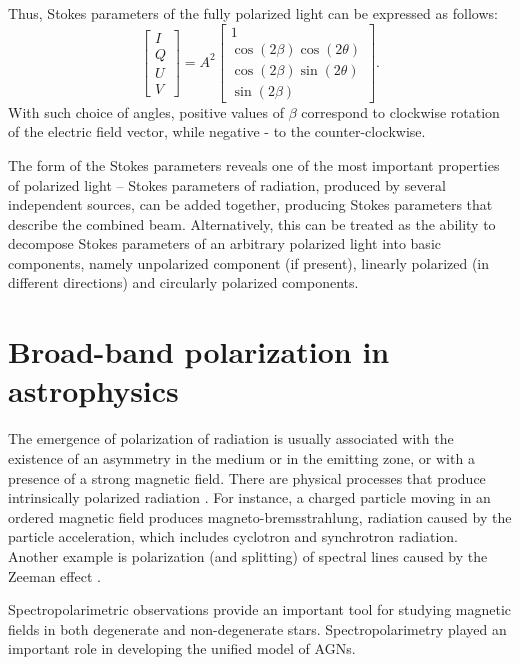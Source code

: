 Thus, Stokes parameters of the fully polarized light can be expressed as follows: 
\begin{equation}
    \begin{bmatrix}
        I\\Q\\U\\V
    \end{bmatrix} = A^2
    \begin{bmatrix}
        1 \\
        \cos(2\beta)\cos(2\theta) \\
        \cos(2\beta)\sin(2\theta) \\
        \sin(2\beta)
    \end{bmatrix}.
\end{equation}
With such choice of angles, positive values of $\beta$ correspond to clockwise rotation of the electric field vector, while negative - to the counter-clockwise.

The form of the Stokes parameters reveals one of the most important properties of polarized light -- Stokes parameters of radiation, produced by several independent sources, can be added together, producing Stokes parameters that describe the combined beam.
Alternatively, this can be treated as the ability to decompose Stokes parameters of an arbitrary polarized light into basic components, namely unpolarized component (if present), linearly polarized (in different directions) and circularly polarized components.

\section{Broad-band polarization in astrophysics}
The emergence of polarization of radiation is usually associated with the existence of an asymmetry in the medium or in the emitting zone, or with a presence of a strong magnetic field.
There are physical processes that produce intrinsically polarized radiation \citep{RadiationProcesses}.
For instance, a charged particle moving in an ordered magnetic field produces magneto-bremsstrahlung, radiation caused by the particle acceleration, which includes cyclotron and synchrotron radiation.
Another example is polarization (and splitting) of spectral lines caused by the Zeeman effect \citep{PolarizationLines}.

Spectropolarimetric observations provide an important tool for studying magnetic fields in both degenerate \citep[e.g.,][]{Schmidt1995} and non-degenerate \citep{Mathys1989, Donati2009} stars.
Spectropolarimetry played an important role in developing the unified model of \glspl{AGN}.

